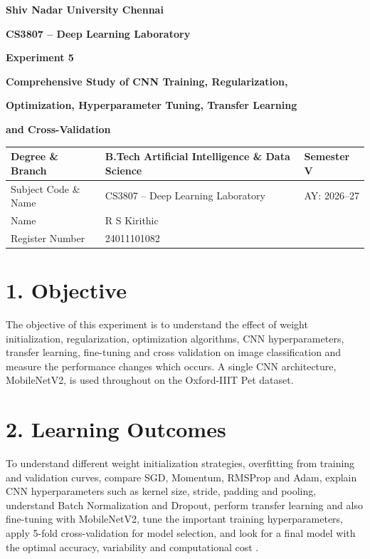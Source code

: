 \documentclass[10pt]{article}
\begin{document}
\begin{center}
{\large\textbf{Shiv Nadar University Chennai}}\vspace{2mm}

{\normalsize\textbf{CS3807 -- Deep Learning Laboratory}}\vspace{2mm}

{\large\textbf{Experiment 5}}\vspace{1mm}

{\normalsize\textbf{Comprehensive Study of CNN Training, Regularization,}}

{\normalsize\textbf{Optimization, Hyperparameter Tuning, Transfer Learning}}

{\normalsize\textbf{and Cross-Validation}}
\end{center}

\vspace{3mm}

\begin{tabular}{|p{3.4cm}|p{9.0cm}|p{1.4cm}|}
\hline
Degree \& Branch & B.Tech Artificial Intelligence \& Data Science & Semester V\\
\hline
Subject Code \& Name & CS3807 -- Deep Learning Laboratory & AY: 2026--27\\
\hline
Name & R S Kirithic & \\
\hline
Register Number & 24011101082 & \\
\hline
\end{tabular}

\section*{1. Objective}

The objective of this experiment is to understand  the effect of weight initialization, regularization, optimization algorithms, CNN hyperparameters, transfer
learning, fine-tuning and cross validation on image classification and measure the performance changes which occurs. A single CNN
architecture, MobileNetV2, is used throughout on the Oxford-IIIT Pet dataset. 

\section*{2. Learning Outcomes}

 To understand different weight initialization
strategies,  overfitting from training and validation curves, compare SGD, Momentum,
RMSProp and Adam, explain CNN hyperparameters such as kernel size, stride, padding and
pooling, understand Batch Normalization and Dropout, perform transfer learning and also
fine-tuning with MobileNetV2, tune the important training hyperparameters, apply 5-fold
cross-validation for model selection, and look for  a final model with the optimal accuracy, variability
and computational cost .
\end{document}
